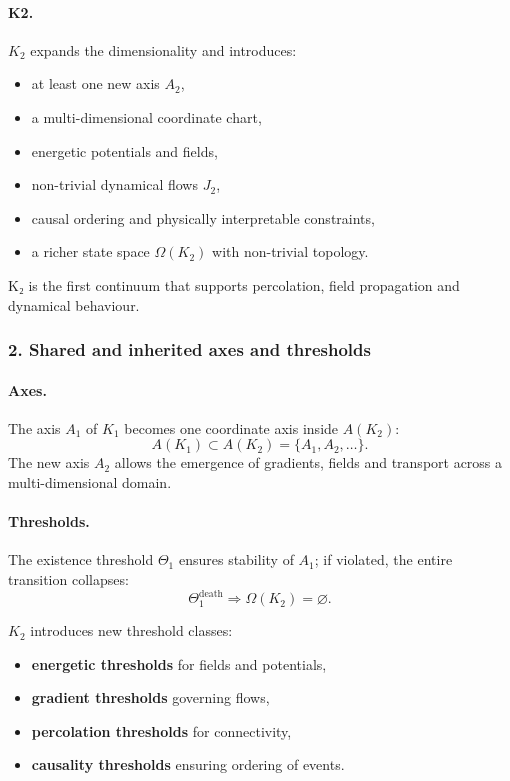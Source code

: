 \paragraph{K2.}
$K_2$ expands the dimensionality and introduces:
\begin{itemize}
  \item at least one new axis $A_2$,
  \item a multi-dimensional coordinate chart,
  \item energetic potentials and fields,
  \item non-trivial dynamical flows $J_2$,
  \item causal ordering and physically interpretable constraints,
  \item a richer state space $\Omega(K_2)$ with non-trivial topology.
\end{itemize}

K₂ is the first continuum that supports percolation, field propagation
and dynamical behaviour.

\subsubsection{2. Shared and inherited axes and thresholds}

\paragraph{Axes.}
The axis $A_1$ of $K_1$ becomes one coordinate axis inside $A(K_2)$:
\[
A(K_1) \subset A(K_2) = \{A_1, A_2, \dots\}.
\]
The new axis $A_2$ allows the emergence of gradients, fields and transport
across a multi-dimensional domain.

\paragraph{Thresholds.}
The existence threshold $\Theta_1$ ensures stability of $A_1$; if violated,
the entire transition collapses:
\[
\Theta_1^{\mathrm{death}} \Rightarrow \Omega(K_2)=\varnothing.
\]

$K_2$ introduces new threshold classes:
\begin{itemize}
  \item \textbf{energetic thresholds} for fields and potentials,
  \item \textbf{gradient thresholds} governing flows,
  \item \textbf{percolation thresholds} for connectivity,
  \item \textbf{causality thresholds} ensuring ordering of events.
\end{itemize}

